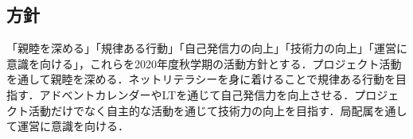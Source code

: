 \subsection*{\firstGrade{}方針}



「親睦を深める」「規律ある行動」「自己発信力の向上」「技術力の向上」「運営に意識を向ける」，これらを{\firstGrade{}}2020年度秋学期の活動方針とする．プロジェクト活動を通して親睦を深める．ネットリテラシーを身に着けることで規律ある行動を目指す．アドベントカレンダーやLTを通じて自己発信力を向上させる．プロジェクト活動だけでなく自主的な活動を通じて技術力の向上を目指す．局配属を通して運営に意識を向ける．

